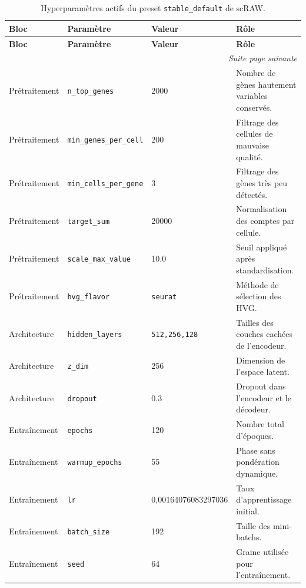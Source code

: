 {\scriptsize
\setlength{\tabcolsep}{3pt}
\renewcommand{\arraystretch}{1.15}
\begin{longtable}{p{}p{}p{}p{}}
\caption{Hyperparamètres actifs du preset \texttt{stable\_default} de scRAW.}
\label{tab:scraw_stable_default_hyperparams}\\
\toprule
\textbf{Bloc} & \textbf{Paramètre} & \textbf{Valeur} & \textbf{Rôle} \\
\midrule
\endfirsthead
\toprule
\textbf{Bloc} & \textbf{Paramètre} & \textbf{Valeur} & \textbf{Rôle} \\
\midrule
\endhead
\midrule
\multicolumn{4}{r}{\textit{Suite page suivante}}\\
\endfoot
\bottomrule
\endlastfoot

Prétraitement & \texttt{n\_top\_genes} & 2000 & Nombre de gènes hautement variables conservés. \\
Prétraitement & \texttt{min\_genes\_per\_cell} & 200 & Filtrage des cellules de mauvaise qualité. \\
Prétraitement & \texttt{min\_cells\_per\_gene} & 3 & Filtrage des gènes très peu détectés. \\
Prétraitement & \texttt{target\_sum} & 20000 & Normalisation des comptes par cellule. \\
Prétraitement & \texttt{scale\_max\_value} & 10.0 & Seuil appliqué après standardisation. \\
Prétraitement & \texttt{hvg\_flavor} & \texttt{seurat} & Méthode de sélection des HVG. \\

Architecture & \texttt{hidden\_layers} & \texttt{512,256,128} & Tailles des couches cachées de l'encodeur. \\
Architecture & \texttt{z\_dim} & 256 & Dimension de l'espace latent. \\
Architecture & \texttt{dropout} & 0.3 & Dropout dans l'encodeur et le décodeur. \\

Entraînement & \texttt{epochs} & 120 & Nombre total d'époques. \\
Entraînement & \texttt{warmup\_epochs} & 55 & Phase sans pondération dynamique. \\
Entraînement & \texttt{lr} & 0,00164076\allowbreak{}083297036 & Taux d'apprentissage initial. \\
Entraînement & \texttt{batch\_size} & 192 & Taille des mini-batchs. \\
Entraînement & \texttt{seed} & 64 & Graine utilisée pour l'entraînement. \\


\end{longtable}}
